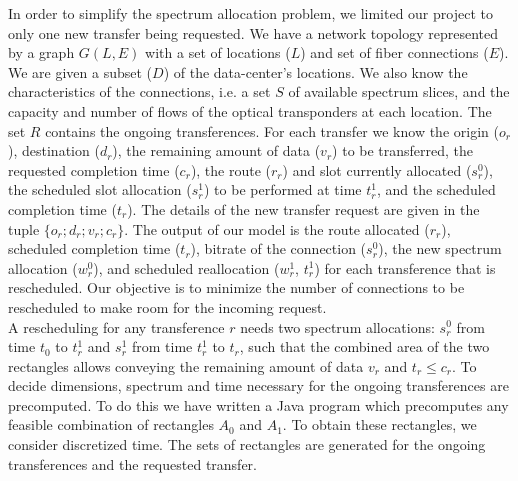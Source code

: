 \documentclass[11pt,a4paper]{article}
\begin{document}
In order to simplify the spectrum allocation problem, we limited our project to only one new transfer being requested. We have a network topology represented by a graph $G(L,E)$ with a set of locations ($L$) and set of fiber connections ($E$). We are given a subset ($D$) of the data-center's locations. We also know the characteristics of the connections, i.e. a set $S$ of available spectrum slices, and the capacity and number of flows of the optical transponders at each location. The set $R$ contains the ongoing transferences. For each transfer we know the origin ($o_{r}$), destination ($d_{r}$), the remaining amount of data ($v_{r}$) to be transferred, the requested completion time ($c_{r}$), the route ($r_{r}$) and slot currently allocated ($s^{0}_{r}$), the scheduled slot allocation ($s^{1}_{r}$) to be performed at time $t^{1}_{r}$, and the scheduled completion time ($t_{r}$). The details of the new transfer request are given in the tuple $\{o_{r}; d_{r}; v_{r}; c_{r}\}$. The output of our model is the route allocated ($r_{r}$), scheduled completion time ($t_{r}$), bitrate of the connection ($s^{0}_{r}$), the new spectrum allocation ($w^{0}_{r}$), and scheduled reallocation ($w^{1}_{r}$, $t^{1}_{r}$) for each transference that is rescheduled. Our objective is to minimize the number of connections to be rescheduled to make room for the incoming request.\\

A rescheduling for any transference $r$ needs two spectrum allocations: $s^{0}_{r}$ from time $t_{0}$ to $t^{1}_{r}$ and $s^{1}_{r}$ from time $t^{1}_{r}$ to $t_{r}$, such that the combined area of the two rectangles allows conveying the remaining amount of data $v_{r}$ and $t_{r} \leq  c_{r}$. To decide dimensions, spectrum and time necessary for the ongoing transferences are precomputed. To do this we have written a Java program which precomputes any feasible combination of rectangles $A_{0}$ and $A_{1}$. To obtain these rectangles, we consider discretized time. The sets of rectangles are generated for the ongoing transferences and the requested transfer.\\
\end{document}
